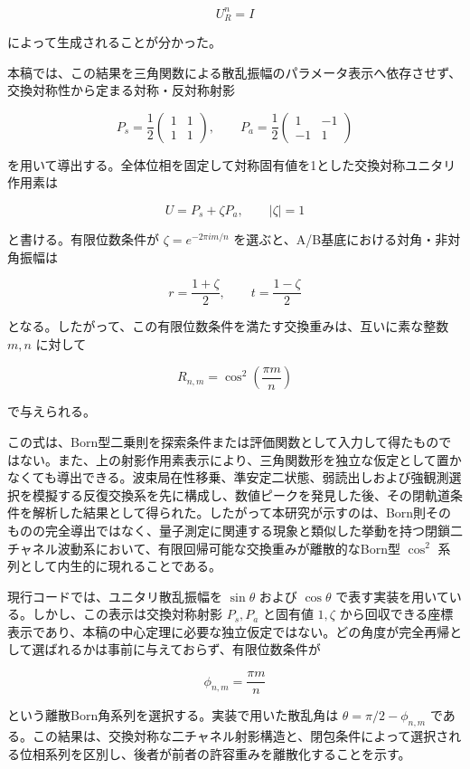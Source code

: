 \documentclass[
  a4paper,
  10pt]{article}
\begin{document}
\[
U_R^n=I
\]

によって生成されることが分かった。

本稿では、この結果を三角関数による散乱振幅のパラメータ表示へ依存させず、交換対称性から定まる対称・反対称射影

\[
P_s=\frac12
\begin{pmatrix}
1&1\\
1&1
\end{pmatrix},
\qquad
P_a=\frac12
\begin{pmatrix}
1&-1\\
-1&1
\end{pmatrix}
\]

を用いて導出する。全体位相を固定して対称固有値を1とした交換対称ユニタリ作用素は

\[
U=P_s+\zeta P_a,
\qquad |\zeta|=1
\]

と書ける。有限位数条件が \(\zeta=e^{-2\pi im/n}\)
を選ぶと、A/B基底における対角・非対角振幅は

\[
r=\frac{1+\zeta}{2},
\qquad
t=\frac{1-\zeta}{2}
\]

となる。したがって、この有限位数条件を満たす交換重みは、互いに素な整数
\(m,n\) に対して

\[
\boxed{
R_{n,m}=\cos^2\left(\frac{\pi m}{n}\right)
}
\]

で与えられる。

この式は、Born型二乗則を探索条件または評価関数として入力して得たものではない。また、上の射影作用素表示により、三角関数形を独立な仮定として置かなくても導出できる。波束局在性移乗、準安定二状態、弱読出しおよび強観測選択を模擬する反復交換系を先に構成し、数値ピークを発見した後、その閉軌道条件を解析した結果として得られた。したがって本研究が示すのは、Born則そのものの完全導出ではなく、量子測定に関連する現象と類似した挙動を持つ閉鎖二チャネル波動系において、有限回帰可能な交換重みが離散的なBorn型
\(\cos^2\) 系列として内生的に現れることである。

現行コードでは、ユニタリ散乱振幅を \(\sin\theta\) および \(\cos\theta\)
で表す実装を用いている。しかし、この表示は交換対称射影 \(P_s,P_a\)
と固有値 \(1,\zeta\)
から回収できる座標表示であり、本稿の中心定理に必要な独立仮定ではない。どの角度が完全再帰として選ばれるかは事前に与えておらず、有限位数条件が

\[
\phi_{n,m}=\frac{\pi m}{n}
\]

という離散Born角系列を選択する。実装で用いた散乱角は
\(\theta=\pi/2-\phi_{n,m}\)
である。この結果は、交換対称な二チャネル射影構造と、閉包条件によって選択される位相系列を区別し、後者が前者の許容重みを離散化することを示す。
\end{document}
